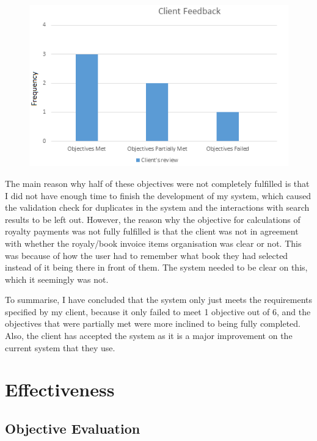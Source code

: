 \begin{figure}[H]
    \includegraphics[width=\textwidth]{./Evaluation/ClientFeedback.png}
    \label{fig:ClientFeedback}
\end{figure}

The main reason why half of these objectives were not completely fulfilled is that I did not have enough time to finish the development of my system, which caused the validation check for duplicates in the system and the interactions with search results to be left out. However, the reason why the objective for calculations of royalty payments was not fully fulfilled is that the client was not in agreement with whether the royaly/book invoice items organisation was clear or not. This was because of how the user had to remember what book they had selected instead of it being there in front of them. The system needed to be clear on this, which it seemingly was not.

To summarise, I have concluded that the system only just meets the requirements specified by my client, because it only failed to meet 1 objective out of 6, and the objectives that were partially met were more inclined to being fully completed. Also, the client has accepted the system as it is a major improvement on the current system that they use.

\section{Effectiveness}

\subsection{Objective Evaluation}

